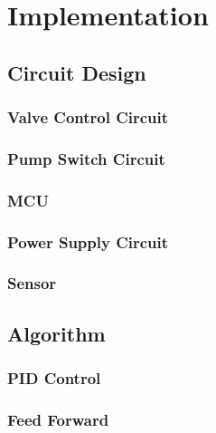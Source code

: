 \chapter{Implementation}
\label{chap:7}

\section{Circuit Design}
\subsection{Valve Control Circuit}
\subsection{Pump Switch Circuit}
\subsection{MCU}
\subsection{Power Supply Circuit}
\subsection{Sensor}

\section{Algorithm}
\subsection{PID Control}
\subsection{Feed Forward}